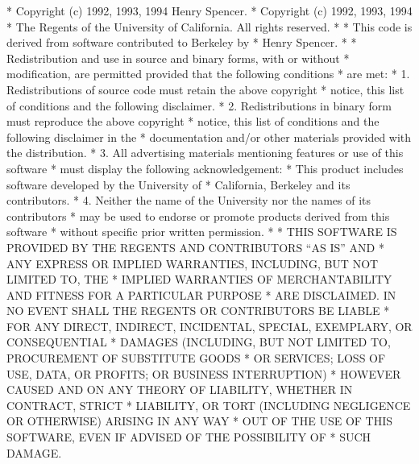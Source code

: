 \begin{copyrightEnv}
 * Copyright (c) 1992, 1993, 1994 Henry Spencer.
 * Copyright (c) 1992, 1993, 1994
 *      The Regents of the University of California.  All rights reserved.
 *
 * This code is derived from software contributed to Berkeley by
 * Henry Spencer.
 *
 * Redistribution and use in source and binary forms, with or without
 * modification, are permitted provided that the following conditions
 * are met:
 * 1. Redistributions of source code must retain the above copyright
 *    notice, this list of conditions and the following disclaimer.
 * 2. Redistributions in binary form must reproduce the above copyright
 *    notice, this list of conditions and the following disclaimer in the
 *    documentation and/or other materials provided with the distribution.
 * 3. All advertising materials mentioning features or use of this software
 *    must display the following acknowledgement:
 *      This product includes software developed by the University of
 *      California, Berkeley and its contributors.
 * 4. Neither the name of the University nor the names of its contributors
 *    may be used to endorse or promote products derived from this software
 *    without specific prior written permission.
 *
 * THIS SOFTWARE IS PROVIDED BY THE REGENTS AND CONTRIBUTORS ``AS IS'' AND
 * ANY EXPRESS OR IMPLIED WARRANTIES, INCLUDING, BUT NOT LIMITED TO, THE
 * IMPLIED WARRANTIES OF MERCHANTABILITY AND FITNESS FOR A PARTICULAR PURPOSE
 * ARE DISCLAIMED.  IN NO EVENT SHALL THE REGENTS OR CONTRIBUTORS BE LIABLE
 * FOR ANY DIRECT, INDIRECT, INCIDENTAL, SPECIAL, EXEMPLARY, OR CONSEQUENTIAL
 * DAMAGES (INCLUDING, BUT NOT LIMITED TO, PROCUREMENT OF SUBSTITUTE GOODS
 * OR SERVICES; LOSS OF USE, DATA, OR PROFITS; OR BUSINESS INTERRUPTION)
 * HOWEVER CAUSED AND ON ANY THEORY OF LIABILITY, WHETHER IN CONTRACT, STRICT
 * LIABILITY, OR TORT (INCLUDING NEGLIGENCE OR OTHERWISE) ARISING IN ANY WAY
 * OUT OF THE USE OF THIS SOFTWARE, EVEN IF ADVISED OF THE POSSIBILITY OF
 * SUCH DAMAGE.
\end{copyrightEnv}

